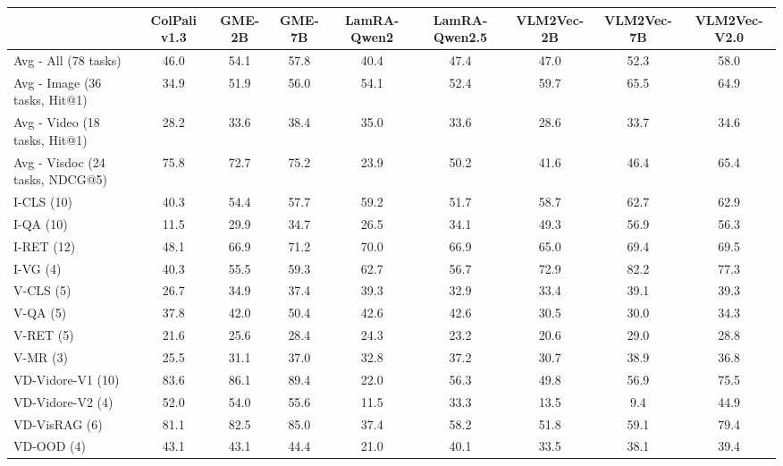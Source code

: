 

\begin{table}[!ht]
    \centering
    \renewcommand{\arraystretch}{0.8}
    \begin{adjustbox}{width=\textwidth}
    \begin{tabular}{l|cccccccc}
        \toprule
        ~ & ColPali v1.3 & GME-2B & GME-7B & LamRA-Qwen2 & LamRA-Qwen2.5 & VLM2Vec-2B & VLM2Vec-7B & VLM2Vec-V2.0 \\ 
        \midrule
        \rowcolor{avgcolor}
        Avg - All (78 tasks) & 46.0 & 54.1 & 57.8 & 40.4 & 47.4 & 47.0 & 52.3 & 58.0 \\ 
        \midrule
        \rowcolor{avgcolor}
        Avg - Image (36 tasks, Hit@1) & 34.9 & 51.9 & 56.0 & 54.1 & 52.4 & 59.7 & 65.5 & 64.9 \\ 
        \rowcolor{avgcolor}
        Avg - Video (18 tasks, Hit@1) & 28.2 & 33.6 & 38.4 & 35.0 & 33.6 & 28.6 & 33.7 & 34.6 \\ 
        \rowcolor{avgcolor}
        Avg - Visdoc (24 tasks, NDCG@5) & 75.8 & 72.7 & 75.2 & 23.9 & 50.2 & 41.6 & 46.4 & 65.4 \\
        \midrule
        \rowcolor{icatcolor}
        I-CLS (10) & 40.3 & 54.4 & 57.7 & 59.2 & 51.7 & 58.7 & 62.7 & 62.9 \\ 
        \rowcolor{icatcolor}
        I-QA (10) & 11.5 & 29.9 & 34.7 & 26.5 & 34.1 & 49.3 & 56.9 & 56.3 \\ 
        \rowcolor{icatcolor}
        I-RET (12) & 48.1 & 66.9 & 71.2 & 70.0 & 66.9 & 65.0 & 69.4 & 69.5 \\ 
        \rowcolor{icatcolor}
        I-VG (4) & 40.3 & 55.5 & 59.3 & 62.7 & 56.7 & 72.9 & 82.2 & 77.3 \\ 
        \rowcolor{vcatcolor}
        V-CLS (5) & 26.7 & 34.9 & 37.4 & 39.3 & 32.9 & 33.4 & 39.1 & 39.3 \\ 
        \rowcolor{vcatcolor}
        V-QA (5) & 37.8 & 42.0 & 50.4 & 42.6 & 42.6 & 30.5 & 30.0 & 34.3 \\ 
        \rowcolor{vcatcolor}
        V-RET (5) & 21.6 & 25.6 & 28.4 & 24.3 & 23.2 & 20.6 & 29.0 & 28.8 \\ 
        \rowcolor{vcatcolor}
        V-MR (3) & 25.5 & 31.1 & 37.0 & 32.8 & 37.2 & 30.7 & 38.9 & 36.8 \\ 
        \rowcolor{vdcatcolor}
        VD-Vidore-V1 (10) & 83.6 & 86.1 & 89.4 & 22.0 & 56.3 & 49.8 & 56.9 & 75.5 \\ 
        \rowcolor{vdcatcolor}
        VD-Vidore-V2 (4) & 52.0 & 54.0 & 55.6 & 11.5 & 33.3 & 13.5 & 9.4 & 44.9 \\ 
        \rowcolor{vdcatcolor}
        VD-VisRAG (6) & 81.1 & 82.5 & 85.0 & 37.4 & 58.2 & 51.8 & 59.1 & 79.4 \\ 
        \rowcolor{vdcatcolor}
        VD-OOD (4) & 43.1 & 43.1 & 44.4 & 21.0 & 40.1 & 33.5 & 38.1 & 39.4 \\ 
        \midrule
        

\end{tabular}
\end{adjustbox}
\end{table}
